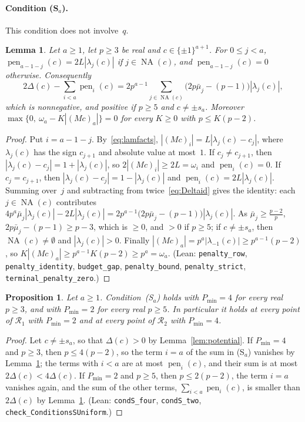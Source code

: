 \documentclass[11pt]{article}
\newtheorem{lemma}[theorem]{Lemma}
\newtheorem{proposition}[theorem]{Proposition}
\theoremstyle{remark}
\newcommand{\NA}{\operatorname{NA}}
\begin{document}
\paragraph{Condition (S$_a$).} This condition does not involve~$q$.

\begin{lemma}\label{lem:pen}
Let $a\ge1$, let $p\ge3$ be real and $c\in\{\pm1\}^{a+1}$. For $0\le j<a$,
$\operatorname{pen}_{a-1-j}(c)=2L|\lambda_j(c)|$ if $j\in\NA(c)$, and
$\operatorname{pen}_{a-1-j}(c)=0$ otherwise. Consequently
\[
2\Delta(c)-\sum_{i<a}\operatorname{pen}_i(c)
=2p^{a-1}\sum_{j\in\NA(c)}\bigl(2p\bar\mu_j-(p-1)\bigr)|\lambda_j(c)|,
\]
which is nonnegative, and positive if $p\ge5$ and $c\ne\pm s_a$. Moreover
$\max\{0,\ \omega_a-K|(Mc)_a|\}=0$ for every $K\ge0$ with $p\le K(p-2)$.
\end{lemma}
\begin{proof}
Put $i=a-1-j$. By~\eqref{eq:lamfacts}, $|(Mc)_i|=L|\lambda_j(c)-c_j|$, where
$\lambda_j(c)$ has the sign $c_{j+1}$ and absolute value at most~$1$. If
$c_j\ne c_{j+1}$, then $|\lambda_j(c)-c_j|=1+|\lambda_j(c)|$, so
$2|(Mc)_i|\ge2L=\omega_i$ and $\operatorname{pen}_i(c)=0$. If $c_j=c_{j+1}$, then
$|\lambda_j(c)-c_j|=1-|\lambda_j(c)|$ and $\operatorname{pen}_i(c)=2L|\lambda_j(c)|$.
Summing over~$j$ and subtracting from twice~\eqref{eq:Deltaid} gives the identity:
each $j\in\NA(c)$ contributes
$4p^a\bar\mu_j|\lambda_j(c)|-2L|\lambda_j(c)|=2p^{a-1}\bigl(2p\bar\mu_j-(p-1)\bigr)|\lambda_j(c)|$. As $\bar\mu_j\ge\frac{p-2}p$,
$2p\bar\mu_j-(p-1)\ge p-3$, which is $\ge0$, and $>0$ if $p\ge5$; if $c\ne\pm
s_a$, then $\NA(c)\ne\emptyset$ and $|\lambda_j(c)|>0$. Finally
$|(Mc)_a|=p^a|\lambda_{-1}(c)|\ge p^{a-1}(p-2)$, so $K|(Mc)_a|\ge
p^{a-1}K(p-2)\ge p^a=\omega_a$. (Lean: \texttt{penalty\_row},
\texttt{penalty\_identity}, \texttt{budget\_gap}, \texttt{penalty\_bound},
\texttt{penalty\_strict}, \texttt{terminal\_penalty\_zero}.)
\end{proof}

\begin{proposition}\label{prop:S}
Let $a\ge1$. Condition~(S$_a$) holds with $P_{\min}=4$ for every real $p\ge3$, and
with $P_{\min}=2$ for every real $p\ge5$. In particular it holds at every point of
$\mathcal R_1$ with $P_{\min}=2$ and at every point of $\mathcal R_2$ with
$P_{\min}=4$.
\end{proposition}
\begin{proof}
Let $c\ne\pm s_a$, so that $\Delta(c)>0$ by Lemma~\ref{lem:potential}. If
$P_{\min}=4$ and $p\ge3$, then $p\le4(p-2)$, so the term $i=a$ of the sum in
(S$_a$) vanishes by Lemma~\ref{lem:pen}; the terms with $i<a$ are at most
$\operatorname{pen}_i(c)$, and their sum is at most $2\Delta(c)<4\Delta(c)$. If
$P_{\min}=2$ and $p\ge5$, then $p\le2(p-2)$, the term $i=a$ vanishes again, and
the sum of the other terms, $\sum_{i<a}\operatorname{pen}_i(c)$, is smaller than
$2\Delta(c)$ by Lemma~\ref{lem:pen}. (Lean: \texttt{condS\_four},
\texttt{condS\_two}, \texttt{check\_ConditionsSUniform}.)
\end{proof}
\end{document}

